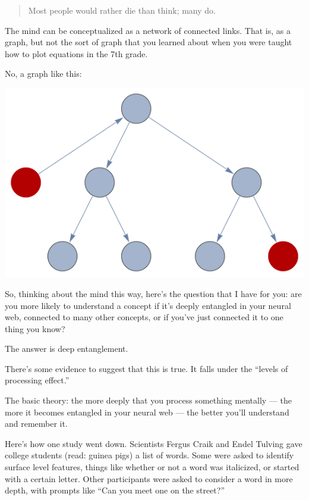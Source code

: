 \begin{quote}
  Most people would rather die than think; many do.
\end{quote}

The mind can be conceptualized as a network of connected links. That is, as a
graph, but not the sort of graph that you learned about when you were taught how to plot
equations in the 7th grade.

No, a graph like this:

\includegraphics[width=\textwidth]{graphics/graph.png}

So, thinking about the mind this way, here's the question that I have for you:
are you more likely to understand a concept if it's deeply entangled in your
neural web, connected to many other concepts, or if you've just
connected it to one thing you know?

The answer is deep entanglement.

There's some evidence to suggest that this is true. It falls under the ``levels
of processing effect.''

The basic theory: the more deeply that you process something mentally --- the more it
becomes entangled in your neural web --- the better you'll understand and remember
it.

Here's how one study went down. Scientists Fergus Craik and Endel Tulving gave
college students (read: guinea pigs) a list of words. Some were asked to identify surface level features, things like
whether or not a word was italicized, or started with a certain letter. Other
participants were asked to consider a word in more depth, with prompts like ``Can you meet
one on the street?''

